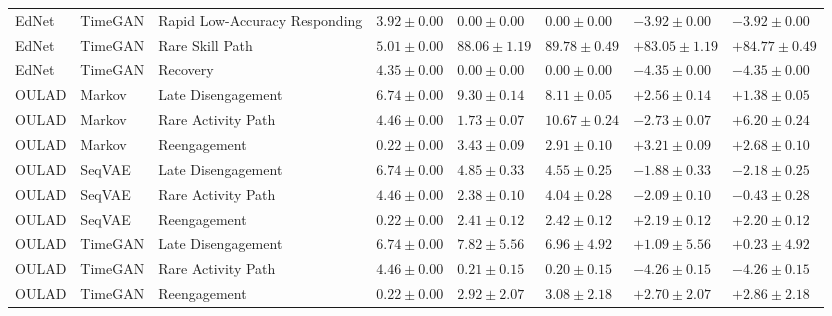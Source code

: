 \begin{longtable}{@{}p{2.0cm}p{1.8cm}p{3.1cm}p{2.0cm}p{2.25cm}p{2.25cm}p{2.35cm}p{2.35cm}@{}}
EdNet & TimeGAN & Rapid Low-Accuracy Responding & $3.92 \mathbin{\pm} 0.00$ & $0.00 \mathbin{\pm} 0.00$ & $0.00 \mathbin{\pm} 0.00$ & $-3.92 \mathbin{\pm} 0.00$ & $-3.92 \mathbin{\pm} 0.00$ \\
EdNet & TimeGAN & Rare Skill Path & $5.01 \mathbin{\pm} 0.00$ & $88.06 \mathbin{\pm} 1.19$ & $89.78 \mathbin{\pm} 0.49$ & $+83.05 \mathbin{\pm} 1.19$ & $+84.77 \mathbin{\pm} 0.49$ \\
EdNet & TimeGAN & Recovery & $4.35 \mathbin{\pm} 0.00$ & $0.00 \mathbin{\pm} 0.00$ & $0.00 \mathbin{\pm} 0.00$ & $-4.35 \mathbin{\pm} 0.00$ & $-4.35 \mathbin{\pm} 0.00$ \\
OULAD & Markov & Late Disengagement & $6.74 \mathbin{\pm} 0.00$ & $9.30 \mathbin{\pm} 0.14$ & $8.11 \mathbin{\pm} 0.05$ & $+2.56 \mathbin{\pm} 0.14$ & $+1.38 \mathbin{\pm} 0.05$ \\
OULAD & Markov & Rare Activity Path & $4.46 \mathbin{\pm} 0.00$ & $1.73 \mathbin{\pm} 0.07$ & $10.67 \mathbin{\pm} 0.24$ & $-2.73 \mathbin{\pm} 0.07$ & $+6.20 \mathbin{\pm} 0.24$ \\
OULAD & Markov & Reengagement & $0.22 \mathbin{\pm} 0.00$ & $3.43 \mathbin{\pm} 0.09$ & $2.91 \mathbin{\pm} 0.10$ & $+3.21 \mathbin{\pm} 0.09$ & $+2.68 \mathbin{\pm} 0.10$ \\
OULAD & SeqVAE & Late Disengagement & $6.74 \mathbin{\pm} 0.00$ & $4.85 \mathbin{\pm} 0.33$ & $4.55 \mathbin{\pm} 0.25$ & $-1.88 \mathbin{\pm} 0.33$ & $-2.18 \mathbin{\pm} 0.25$ \\
OULAD & SeqVAE & Rare Activity Path & $4.46 \mathbin{\pm} 0.00$ & $2.38 \mathbin{\pm} 0.10$ & $4.04 \mathbin{\pm} 0.28$ & $-2.09 \mathbin{\pm} 0.10$ & $-0.43 \mathbin{\pm} 0.28$ \\
OULAD & SeqVAE & Reengagement & $0.22 \mathbin{\pm} 0.00$ & $2.41 \mathbin{\pm} 0.12$ & $2.42 \mathbin{\pm} 0.12$ & $+2.19 \mathbin{\pm} 0.12$ & $+2.20 \mathbin{\pm} 0.12$ \\
OULAD & TimeGAN & Late Disengagement & $6.74 \mathbin{\pm} 0.00$ & $7.82 \mathbin{\pm} 5.56$ & $6.96 \mathbin{\pm} 4.92$ & $+1.09 \mathbin{\pm} 5.56$ & $+0.23 \mathbin{\pm} 4.92$ \\
OULAD & TimeGAN & Rare Activity Path & $4.46 \mathbin{\pm} 0.00$ & $0.21 \mathbin{\pm} 0.15$ & $0.20 \mathbin{\pm} 0.15$ & $-4.26 \mathbin{\pm} 0.15$ & $-4.26 \mathbin{\pm} 0.15$ \\
OULAD & TimeGAN & Reengagement & $0.22 \mathbin{\pm} 0.00$ & $2.92 \mathbin{\pm} 2.07$ & $3.08 \mathbin{\pm} 2.18$ & $+2.70 \mathbin{\pm} 2.07$ & $+2.86 \mathbin{\pm} 2.18$ \\
\end{longtable}
\endgroup
